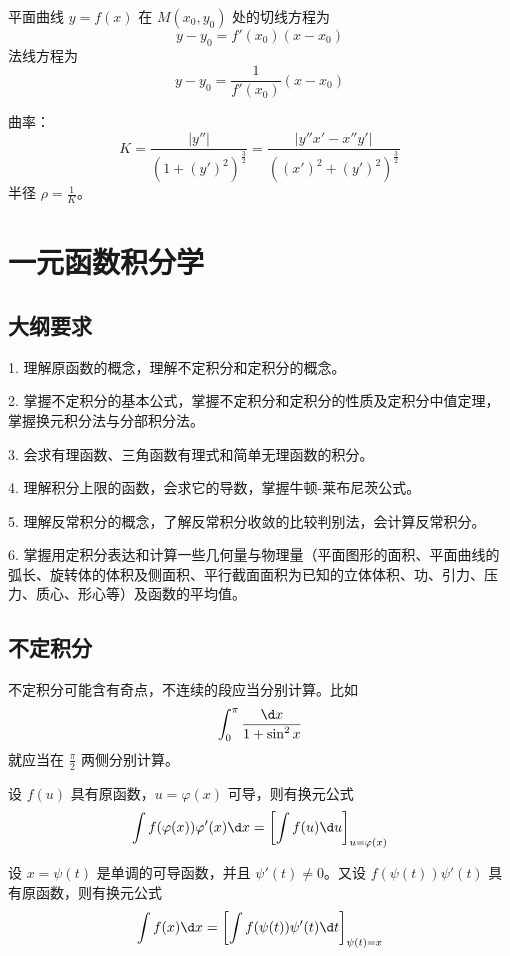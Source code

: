 平面曲线 $y = f(x)$ 在 $M(x_0, y_0)$ 处的切线方程为
\[ y - y_0 = f'(x_0)(x - x_0) \]
法线方程为
\[ y - y_0 = \frac{1}{f'(x_0)}(x - x_0) \]

曲率：
\[ K = \frac{|y''|}{\left(1 + (y')^2\right)^{\frac{3}{2}}} = \frac{|y''x' - x''y'|}{((x')^2 + (y')^2)^{\frac{3}{2}}} \]
半径 $\rho = \frac{1}{K}$。

\section{一元函数积分学}

\subsection{大纲要求}

1. 理解原函数的概念，理解不定积分和定积分的概念。

2. 掌握不定积分的基本公式，掌握不定积分和定积分的性质及定积分中值定理，掌握换元积分法与分部积分法。

3. 会求有理函数、三角函数有理式和简单无理函数的积分。

4. 理解积分上限的函数，会求它的导数，掌握牛顿-莱布尼茨公式。

5. 理解反常积分的概念，了解反常积分收敛的比较判别法，会计算反常积分。

6. 掌握用定积分表达和计算一些几何量与物理量（平面图形的面积、平面曲线的弧长、旋转体的体积及侧面积、平行截面面积为已知的立体体积、功、引力、压力、质心、形心等）及函数的平均值。

\subsection{不定积分}

\begin{note}
	不定积分可能含有奇点，不连续的段应当分别计算。比如
	\[ \int_{0}^{\pi} \frac{\d x}{1 + \sin^2 x} \]
	就应当在 $\frac{\pi}{2}$ 两侧分别计算。
\end{note}

\begin{theorem}[第一类换元积分法]
	设 $f(u)$ 具有原函数，$u = \varphi(x)$ 可导，则有换元公式
	\[ \int f(\varphi(x)) \varphi'(x) \d x = \left[\int f(u) \d u \right]_{u = \varphi(x)} \]
\end{theorem}

\begin{theorem}[第二类换元积分法]
	设 $x = \psi(t)$ 是单调的可导函数，并且 $\psi'(t) \neq 0$。又设 $f(\psi(t)) \psi'(t)$ 具有原函数，则有换元公式
	\[ \int f(x) \d x = \left[ \int f(\psi(t))\psi'(t) \d t \right]_{\psi(t) = x} \]
\end{theorem}

